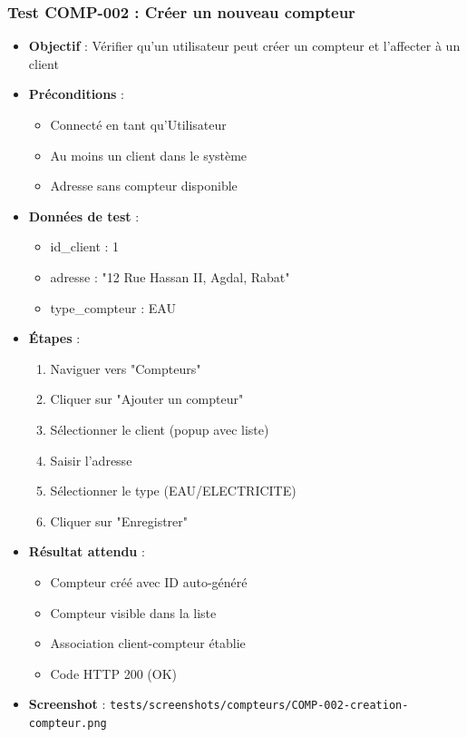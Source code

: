 \subsubsection{Test COMP-002 : Créer un nouveau compteur}
\begin{itemize}
    \item \textbf{Objectif} : Vérifier qu'un utilisateur peut créer un compteur et l'affecter à un client
    \item \textbf{Préconditions} : 
        \begin{itemize}
            \item Connecté en tant qu'Utilisateur
            \item Au moins un client dans le système
            \item Adresse sans compteur disponible
        \end{itemize}
    \item \textbf{Données de test} :
        \begin{itemize}
            \item id\_client : 1
            \item adresse : "12 Rue Hassan II, Agdal, Rabat"
            \item type\_compteur : EAU
        \end{itemize}
    \item \textbf{Étapes} :
        \begin{enumerate}
            \item Naviguer vers "Compteurs"
            \item Cliquer sur "Ajouter un compteur"
            \item Sélectionner le client (popup avec liste)
            \item Saisir l'adresse
            \item Sélectionner le type (EAU/ELECTRICITE)
            \item Cliquer sur "Enregistrer"
        \end{enumerate}
    \item \textbf{Résultat attendu} : 
        \begin{itemize}
            \item Compteur créé avec ID auto-généré
            \item Compteur visible dans la liste
            \item Association client-compteur établie
            \item Code HTTP 200 (OK)
        \end{itemize}
    \item \textbf{Screenshot} : \texttt{tests/screenshots/compteurs/COMP-002-creation-compteur.png}
\end{itemize}

